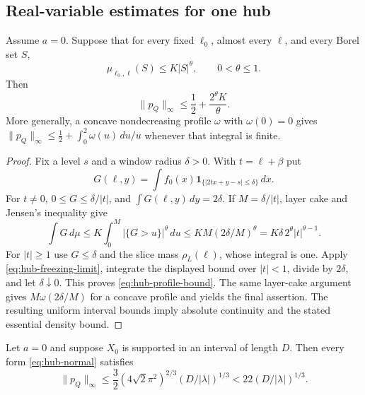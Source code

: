 \subsection{Real-variable estimates for one hub}

\begin{lemma}\label{lem:hub-profile}
Assume $a=0$.  Suppose that for every fixed $\ell_0$, almost every
$\ell$, and every Borel set $S$,
\[
 \mu_{\ell_0,\ell}(S)\le K|S|^\theta,
 \qquad 0<\theta\le1.
\]
Then
\begin{equation}\label{eq:hub-profile-bound}
 \|p_Q\|_\infty\le\frac12+\frac{2^\theta K}{\theta}.
\end{equation}
More generally, a concave nondecreasing profile $\omega$ with
$\omega(0)=0$ gives
$\|p_Q\|_\infty\le\frac12+\int_0^2\omega(u)\,du/u$ whenever
that integral is finite.
\end{lemma}

\begin{proof}
Fix a level $s$ and a window radius $\delta>0$.  With $t=\ell+\beta$ put
\[
 G(\ell,y)=\int f_0(x)
            \mathbf1_{\{|2tx+y-s|\le\delta\}}\,dx.
\]
For $t\ne0$, $0\le G\le\delta/|t|$, and $\int G(\ell,y)\,dy=2\delta$.
If $M=\delta/|t|$, layer cake and Jensen's inequality give
\[
 \int G\,d\mu
  \le K\int_0^M |\{G>u\}|^\theta\,du
  \le KM(2\delta/M)^\theta
  =K\delta\,2^\theta|t|^{\theta-1}.
\]
For $|t|\ge1$ use $G\le\delta$ and the slice mass
$\rho_L(\ell)$, whose integral is one.  Apply
\eqref{eq:hub-freezing-limit}, integrate the displayed bound over
$|t|<1$, divide by $2\delta$, and let $\delta\downarrow0$.
This proves \eqref{eq:hub-profile-bound}.  The same layer-cake argument
gives $M\omega(2\delta/M)$ for a concave profile and yields the final
assertion.  The resulting uniform interval bounds imply absolute
continuity and the stated essential density bound.
\end{proof}

\begin{theorem}\label{thm:hub-interval}
Let $a=0$ and suppose $X_0$ is supported in an interval of length $D$.
Then every form \eqref{eq:hub-normal} satisfies
\begin{equation}\label{eq:hub-interval-bound}
 \|p_Q\|_\infty\le
 \frac32(4\sqrt2\pi^2)^{2/3}(D/|\lambda|)^{1/3}
 <22(D/|\lambda|)^{1/3}.
\end{equation}
\end{theorem}

